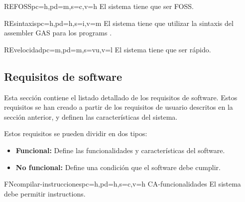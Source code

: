 \begin{userReq}{RE}{FOSS}{pc=h,pd=m,s=c,v=h}
    El sistema tiene que ser \gls{FOSS}.
\end{userReq}

\begin{userReq}{RE}{sintaxis}{pc=h,pd=h,s=i,v=m}
    El sistema tiene que utilizar la sintaxis del \gls{assembler} GAS
    \parencite{as-manual} para los \glspl{program} .
\end{userReq}

\begin{userReq}{RE}{velocidad}{pc=m,pd=m,s=vu,v=l}
    El sistema tiene que ser rápido.
\end{userReq}

\FloatBarrier


\subsection{Requisitos de software}\label{subsec:software-requirements}

Esta sección contiene el listado detallado de los requisitos de software. Estos
requisitos se han creado a partir de los requisitos de usuario descritos en la
sección anterior, y definen las características del sistema.

\noindent
Estos requisitos se pueden dividir en dos tipos:

\begin{itemize}
    \item \textbf{Funcional:} Define las funcionalidades y características del
    software.
    \item \textbf{No funcional:} Define una condición que el software debe cumplir.
\end{itemize}

\printsreqtemplate


\begin{softwareReq}{FN}{compilar-instrucciones}{pc=h,pd=h,s=c,v=h}
    {CA-funcionalidades}
    El sistema debe permitir  \glspl{instruction}.
\end{softwareReq}

